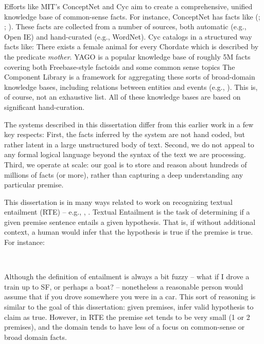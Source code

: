 Efforts like MIT's ConceptNet \cite{key:2011tandon-conceptnet} and Cyc \cite{key:1995lenat-cyc}
  aim to create a comprehensive, unified knowledge base of common-sense facts.
For instance, ConceptNet has facts like (; ; ).
These facts are collected from a number of sources, both automatic (e.g., Open IE) and hand-curated
  (e.g., WordNet).
Cyc catalogs in a structured way facts like: There exists a female animal for every Chordate
  which is described by the predicate \textit{mother}.
YAGO \cite{key:2007suchanek-yago} is a popular knowledge base of roughly 5M facts covering
  both Freebase-style factoids and some common sense topics
The Component Library \cite{key:2001barker-component} is a framework for aggregating these sorts of
  broad-domain knowledge bases, including relations between entities and events (e.g.,
  ).
This is, of course, not an exhaustive list.
All of these knowledge bases are based on significant hand-curation.

The systems described in this dissertation differ from this earlier work in a few key respects:
First, the facts inferred by the system are not hand coded, but rather latent in a large
  unstructured body of text.
Second, we do not appeal to any formal logical language beyond the syntax of the text we are processing.
Third, we operate at scale: our goal is to store and reason about hundreds of millions of facts (or more),
  rather than capturing a deep understanding any particular premise.


%
%

This dissertation is in many ways related to work on 
  recognizing textual entailment (RTE) -- e.g., 
  , .
Textual Entailment is the task of determining if a given premise sentence
  entails a given hypothesis.
That is, if without additional context, a human would infer that the hypothesis
  is true if the premise is true.
For instance:

\begin{displayquote}
   \\
\end{displayquote}

Although the definition of entailment is always a bit fuzzy -- what if I drove a train
  up to SF, or perhaps a boat? -- nonetheless a reasonable person would assume that if
  you drove somewhere you were in a car.
This sort of reasoning is similar to the goal of this dissertation: given premises, infer
  valid hypothesis to claim as true.
However, in RTE the premise set tends to be very small (1 or 2 premises), and the domain
  tends to have less of a focus on common-sense or broad domain facts.


